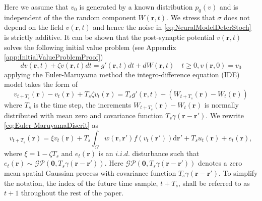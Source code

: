 \documentclass[a4paper,10pt]{article}
\begin{document}
Here we assume that $v_0$ is generated by a known distribution $p_0(v)$ and is
independent of the the random component $W(\mathbf r,t)$. We stress that
$\sigma$ does not depend on the field $v(\mathbf r, t)$
and hence the noise in \eqref{eq:NeuralModelDeterStoch} is strictly additive. It
can be shown that the post-synaptic potential $v(\mathbf r, t)$ solves the
following initial value problem (see Appendix
\ref{app:InitialValueProblemProof})
\begin{equation}
 dv(\mathbf r, t) + \zeta v(\mathbf r, t)dt = g'(\mathbf r, t)dt + dW(\mathbf r,
t) \quad t\ge0, v(\mathbf r, 0) = v_0
\end{equation}
applying the Euler-Maruyama method the integro-difference equation (IDE) model
takes the form of
\begin{equation}\label{eq:Euler-MaruyamaDiscrit}
 v_{t+T_s}(\mathbf r)- v_{t}(\mathbf r)+ T_s\zeta v_t(\mathbf r)= T_sg'(\mathbf
r, t) + (W_{t+T_s}(\mathbf r)-W_t(\mathbf r))
\end{equation}
where $T_s$ is the time step, the increments $W_{t+T_s}(\mathbf r)-W_t(\mathbf
r)$ is normally distributed with mean zero and covariance function
$T_s\gamma(\mathbf r-\mathbf r')$. We rewrite \eqref{eq:Euler-MaruyamaDiscrit}
as
\begin{equation}
	\label{DiscreteTimeModel} 
	v_{t+T_s}\left(\mathbf{r}\right) = 
	\xi v_t\left(\mathbf{r}\right) + 
	T_s \int_\Omega { 
	    w\left(\mathbf{r},\mathbf{r}'\right)
	    f\left(v_t\left(\mathbf{r}'\right)\right) 
	\textrm{d}\mathbf{r}'}+T_su_t(\mathbf r)
	+ e_t\left(\mathbf{r}\right), 
\end{equation}
 where $\xi = 1-\zeta T_s$ and $e_t(\mathbf{r})$ is an $i.i.d.$ disturbance such
that $e_t(\mathbf{r})\sim\mathcal{GP}(\mathbf
0,T_s\gamma(\mathbf{r}-\mathbf{r}'))$. Here $\mathcal{GP}(\mathbf
0,T_s\gamma(\mathbf{r}-\mathbf{r}'))$ denotes a zero mean spatial Gaussian
process with covariance function $T_s\gamma(\mathbf{r}-\mathbf{r}')$. To
simplify the notation, the index of the future time sample, $t+T_s$, shall be
referred to as $t+1$ throughout the rest of the paper. 
\end{document}
